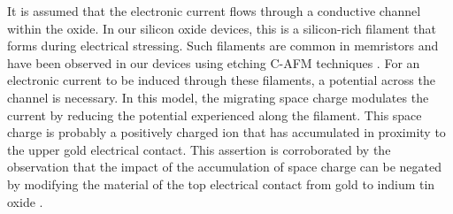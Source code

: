 

\noindent It is assumed that the electronic current flows through a conductive channel within the oxide. In our silicon oxide devices, this is a silicon-rich filament that forms during electrical stressing. Such filaments are common in memristors and have been observed in our devices using etching C-AFM techniques \cite{buckwell2015conductance}. For an electronic current to be induced through these filaments, a potential across the channel is necessary. In this model, the migrating space charge modulates the current by reducing the potential experienced along the filament. This space charge is probably a positively charged ion that has accumulated in proximity to the upper gold electrical contact. This assertion is corroborated by the observation that the impact of the accumulation of space charge can be negated by modifying the material of the top electrical contact from gold to indium tin oxide \cite{mannion2022current}.\\


